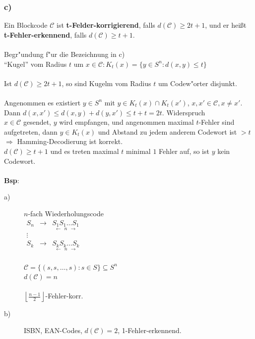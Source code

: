 \subsubsection{c)} 
Ein Blockcode $\mathcal{C}$ ist \textbf{t-Felder-korrigierend}, falls $d(\mathcal{C}) \geq 2t+1$, und er hei\ss t \textbf{t-Fehler-erkennend}, falls $d(\mathcal{C}) \geq t+1$. \\
\\
Begr"undung f"ur die Bezeichnung in c) \\
"`Kugel"' vom Radius $t$ um $x \in \mathcal{C}: K_t(x) = \{y \in S^n: d(x,y) \leq t\}$\\
\\
Ist $d(\mathcal{C}) \geq 2t+1$, so sind Kugelm vom Radius $t$ um Codew"orter disjunkt. \\
\\
Angenommen es existiert $y \in S^n$ mit $y \in K_t(x)\cap K_t(x')$, $x,x' \in \mathcal{C}, x \neq x'$. Dann $d(x,x') \leq d(x,y)+d(y,x') \leq t+t = 2t$. Widerspruch\\ %
$x \in \mathcal{C}$ gesendet, $y$ wird empfangen, und angenommen maximal $t$-Fehler sind aufgetreten, dann $y \in K_t(x)$ und Abstand zu jedem anderem Codewort ist $> t$\\
$\Rightarrow$ Hamming-Decodierung ist korrekt.\\
$d(\mathcal{C}) \geq t+1$ und es treten maximal $t$ minimal $1$ Fehler auf, so ist $y$ kein Codewort.\\
\\
\textbf{Bsp}: 
\begin{description}
	\item[a)] $n$-fach Wiederholungscode \\
	$
	\begin{matrix} 
		S_n & \rightarrow & \underset{\longleftarrow \ \ n \ \ \longrightarrow}{S_1 S_1 \ldots S_1} \\ 
		\vdots \\
		S_k & \rightarrow & \underset{\longleftarrow \ \ n \ \ \longrightarrow}{S_k S_k \ldots S_k}
	\end{matrix}$\\
	\\
	$\mathcal{C}=\lbrace (s,s,\ldots,s): s \in S \rbrace \subseteq S^n$ \\
	$d(\mathcal{C})=n$ \\
	\\
	$\left\lfloor \frac{n-1}{2} \right\rfloor$-Fehler-korr.
	\item[b)] ISBN, EAN-Codes, $d(\mathcal{C})=2$, 1-Fehler-erkennend.
\end{description}

